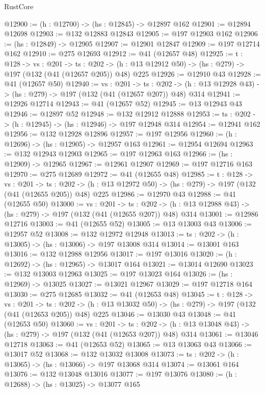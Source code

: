 \begin{lexlean}{RustCore}
\begin{coremodule}
@12900 := (h : @12700) -> (hs : @12845) -> @12897 @162
@12901 := @12894 @12698
@12903 := @132 @12883 @12843
@12905 := @197 @12903 @162
@12906 := (hs : @12849) -> @12905
@12907 := @12901 @12847
@12909 := @197 @12714 @162
@12910 := @275 @12693
@12912 := @41 (@12657 @48)
@12925 := {t : @128} ->
  {vs : @201} ->
  {ts : @202} -> (h : @13 @12912 @50) -> (hs : @279) -> @197 (@132 (@41 (@12657 @205)) @48) @225
@12926 := @12910 @43
@12928 := @41 (@12657 @50)
@12940 := {vs : @201} ->
  {ts : @202} -> (h : @13 @12928 @43) -> (hs : @279) -> @197 (@132 (@41 (@12657 @207)) @48) @314
@12941 := @12926 @12714
@12943 := @41 (@12657 @52)
@12945 := @13 @12943 @43
@12946 := @12897 @52
@12948 := @132 @12912 @12888
@12953 := {ts : @202} -> (h : @12945) -> (hs : @12946) -> @197 @12948 @314
@12954 := @12941 @162
@12956 := @132 @12928 @12896
@12957 := @197 @12956
@12960 := (h : @12696) -> (hs : @12905) -> @12957 @163
@12961 := @12954 @12694
@12963 := @132 @12943 @12903
@12965 := @197 @12963 @163
@12966 := (hs : @12909) -> @12965
@12967 := @12961 @12907
@12969 := @197 @12716 @163
@12970 := @275 @12689
@12972 := @41 (@12655 @48)
@12985 := {t : @128} ->
  {vs : @201} ->
  {ts : @202} -> (h : @13 @12972 @50) -> (hs : @279) -> @197 (@132 (@41 (@12655 @205)) @48) @225
@12986 := @12970 @43
@12988 := @41 (@12655 @50)
@13000 := {vs : @201} ->
  {ts : @202} -> (h : @13 @12988 @43) -> (hs : @279) -> @197 (@132 (@41 (@12655 @207)) @48) @314
@13001 := @12986 @12716
@13003 := @41 (@12655 @52)
@13005 := @13 @13003 @43
@13006 := @12957 @52
@13008 := @132 @12972 @12948
@13013 := {ts : @202} -> (h : @13005) -> (hs : @13006) -> @197 @13008 @314
@13014 := @13001 @163
@13016 := @132 @12988 @12956
@13017 := @197 @13016
@13020 := (h : @12692) -> (hs : @12965) -> @13017 @164
@13021 := @13014 @12690
@13023 := @132 @13003 @12963
@13025 := @197 @13023 @164
@13026 := (hs : @12969) -> @13025
@13027 := @13021 @12967
@13029 := @197 @12718 @164
@13030 := @275 @12685
@13032 := @41 (@12653 @48)
@13045 := {t : @128} ->
  {vs : @201} ->
  {ts : @202} -> (h : @13 @13032 @50) -> (hs : @279) -> @197 (@132 (@41 (@12653 @205)) @48) @225
@13046 := @13030 @43
@13048 := @41 (@12653 @50)
@13060 := {vs : @201} ->
  {ts : @202} -> (h : @13 @13048 @43) -> (hs : @279) -> @197 (@132 (@41 (@12653 @207)) @48) @314
@13061 := @13046 @12718
@13063 := @41 (@12653 @52)
@13065 := @13 @13063 @43
@13066 := @13017 @52
@13068 := @132 @13032 @13008
@13073 := {ts : @202} -> (h : @13065) -> (hs : @13066) -> @197 @13068 @314
@13074 := @13061 @164
@13076 := @132 @13048 @13016
@13077 := @197 @13076
@13080 := (h : @12688) -> (hs : @13025) -> @13077 @165

\end{coremodule}
\end{lexlean}

